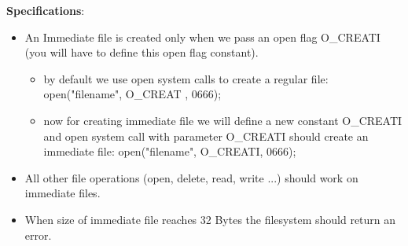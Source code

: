  {\bf Specifications}:\\
\begin{itemize}
\item An Immediate file is created only when we pass an open flag O\_CREATI (you will have to define this open flag constant).
\begin{itemize}
\item by default we use open system calls to create a regular file:
    open("filename", O\_CREAT , 0666);
    
\item  now for creating immediate file we will define a new constant O\_CREATI and open system call with parameter O\_CREATI should create an immediate file:
    open("filename", O\_CREATI, 0666);   
\end{itemize}

\item All other file operations (open, delete, read, write ...) should work on immediate files.
\item When size of immediate file reaches 32 Bytes the filesystem should return an error. 

\end{itemize}


